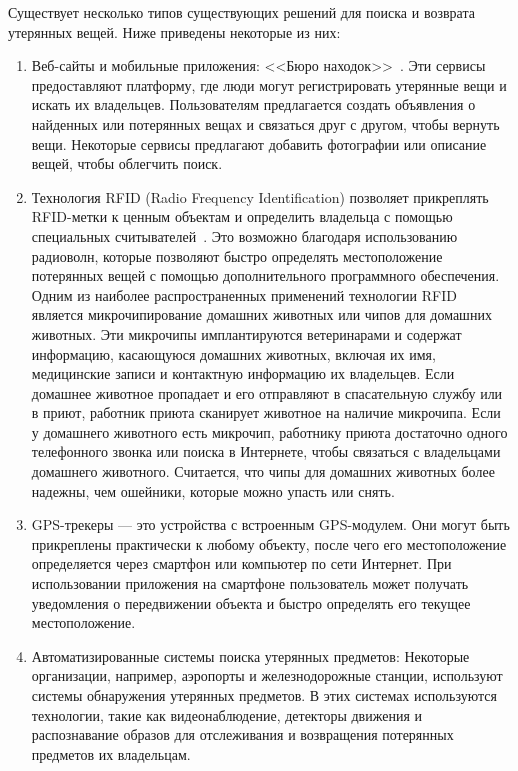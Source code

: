\documentclass{../mirea}
\begin{document}
	Существует несколько типов существующих решений для поиска и возврата утерянных вещей. Ниже приведены некоторые из них:
	\begin{enumerate}
		\item Веб-сайты и мобильные приложения: <<Бюро находок>>~\cite{bib:stol_nahodok,bib:pona}. Эти сервисы предоставляют платформу, где люди могут регистрировать утерянные вещи и искать их владельцев. Пользователям предлагается создать объявления о найденных или потерянных вещах и связаться друг с другом, чтобы вернуть вещи. Некоторые сервисы предлагают добавить фотографии или описание вещей, чтобы облегчить поиск. 
		
		\item Технология RFID (Radio Frequency Identification) позволяет прикреплять RFID-метки к ценным объектам и определить владельца с помощью специальных считывателей~\cite{bib:investopedia_rfid,bib:airtag}. Это возможно благодаря использованию радиоволн, которые позволяют быстро определять местоположение потерянных вещей с помощью дополнительного программного обеспечения. Одним из наиболее распространенных применений технологии RFID является микрочипирование домашних животных или чипов для домашних животных. Эти микрочипы имплантируются ветеринарами и содержат информацию, касающуюся домашних животных, включая их имя, медицинские записи и контактную информацию их владельцев. Если домашнее животное пропадает и его отправляют в спасательную службу или в приют, работник приюта сканирует животное на наличие микрочипа. Если у домашнего животного есть микрочип, работнику приюта достаточно одного телефонного звонка или поиска в Интернете, чтобы связаться с владельцами домашнего животного. Считается, что чипы для домашних животных более надежны, чем ошейники, которые можно упасть или снять.
		
		\item GPS-трекеры --- это устройства с встроенным GPS-модулем. Они могут быть прикреплены практически к любому объекту, после чего его местоположение определяется через смартфон или компьютер по сети Интернет. При использовании приложения на смартфоне пользователь может получать уведомления о передвижении объекта и быстро определять его текущее местоположение.
		
		\item Автоматизированные системы поиска утерянных предметов: Некоторые организации, например, аэропорты и железнодорожные станции, используют системы обнаружения утерянных предметов. В этих системах используются технологии, такие как видеонаблюдение, детекторы движения и распознавание образов для отслеживания и возвращения потерянных предметов их владельцам.
	\end{enumerate}
	
\end{document}
